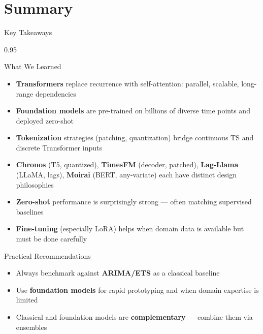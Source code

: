 \documentclass[9pt, aspectratio=169, t]{beamer}
\begin{document}
\section{Summary}

\begin{frame}{Key Takeaways}
    \begin{cminipage}{0.95\textwidth}
    \vspace{-0.2cm}
    \begin{block}{What We Learned}
        {\small
        \begin{itemize}\setlength{\itemsep}{0pt}
            \item \textbf{Transformers} replace recurrence with self-attention: parallel, scalable, long-range dependencies
            \item \textbf{Foundation models} are pre-trained on billions of diverse time points and deployed zero-shot
            \item \textbf{Tokenization} strategies (patching, quantization) bridge continuous TS and discrete Transformer inputs
            \item \textbf{Chronos} (T5, quantized), \textbf{TimesFM} (decoder, patched), \textbf{Lag-Llama} (LLaMA, lags), \textbf{Moirai} (BERT, any-variate) each have distinct design philosophies
            \item \textbf{Zero-shot} performance is surprisingly strong --- often matching supervised baselines
            \item \textbf{Fine-tuning} (especially LoRA) helps when domain data is available but must be done carefully
        \end{itemize}
        }
    \end{block}
    \vspace{-2mm}
    \begin{alertblock}{Practical Recommendations}
        {\small
        \begin{itemize}\setlength{\itemsep}{0pt}
            \item Always benchmark against \textbf{ARIMA/ETS} as a classical baseline
            \item Use \textbf{foundation models} for rapid prototyping and when domain expertise is limited
            \item Classical and foundation models are \textbf{complementary} --- combine them via ensembles
        \end{itemize}
        }
    \end{alertblock}
    \end{cminipage}
\end{frame}
\end{document}
